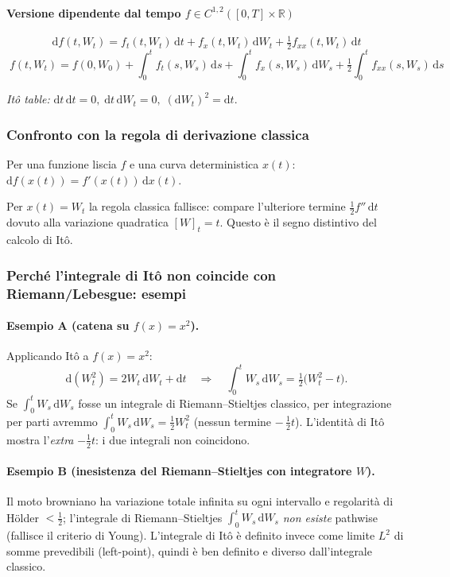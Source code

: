 \documentclass[12pt,a4paper]{book}
\theoremstyle{remark}
\newcommand{\RR}{\mathbb{R}}
\newcommand{\dd}{\mathrm{d}}
\begin{document}
\paragraph{Versione dipendente dal tempo $f\in C^{1,2}([0,T]\times\RR)$}
\[
\boxed{\; \dd f(t,W_t)= f_t(t,W_t)\,\dd t + f_x(t,W_t)\,\dd W_t + \tfrac12 f_{xx}(t,W_t)\,\dd t \;}
\]
\[
\boxed{\; f(t,W_t)= f(0,W_0)+ \int_0^t f_t(s,W_s)\,\dd s + \int_0^t f_x(s,W_s)\,\dd W_s + \tfrac12\int_0^t f_{xx}(s,W_s)\,\dd s \;}
\]

\medskip
\noindent\textit{It\^o table:} \; $\dd t\,\dd t=0,\; \dd t\,\dd W_t=0,\; (\dd W_t)^2=\dd t.$

\subsubsection*{Confronto con la regola di derivazione classica}
Per una funzione liscia $f$ e una curva deterministica $x(t)$: \; $\dd f(x(t)) = f'(x(t))\,\dd x(t)$.
\medskip

Per $x(t)=W_t$ la regola classica fallisce: compare l’ulteriore termine $\tfrac12 f''\,\dd t$ dovuto alla variazione quadratica $[W]_t=t$. Questo è il segno distintivo del calcolo di It\^o.

\subsubsection*{Perché l’integrale di It\^o non coincide con Riemann/Lebesgue: esempi}

\paragraph{Esempio A (catena su $f(x)=x^2$).}
Applicando It\^o a $f(x)=x^2$:
\[
\dd (W_t^2)= 2W_t\,\dd W_t + \dd t
\quad\Rightarrow\quad
\int_0^t W_s\,\dd W_s = \tfrac12\big(W_t^2 - t\big).
\]
Se $\int_0^t W_s\,\dd W_s$ fosse un integrale di Riemann--Stieltjes classico, per integrazione per parti avremmo
$\int_0^t W_s\,\dd W_s = \tfrac12 W_t^2$ (nessun termine $-\,\tfrac12 t$).
L’identità di It\^o mostra l’\emph{extra} $-\tfrac12 t$: i due integrali non coincidono.

\paragraph{Esempio B (inesistenza del Riemann--Stieltjes con integratore $W$).}
Il moto browniano ha variazione totale infinita su ogni intervallo e regolarità di Hölder $<\tfrac12$; l’integrale di Riemann--Stieltjes $\int_0^t W_s\,\dd W_s$ \emph{non esiste} pathwise (fallisce il criterio di Young). L’integrale di It\^o è definito invece come limite $L^2$ di somme prevedibili (left-point), quindi è ben definito e diverso dall’integrale classico.
\end{document}
